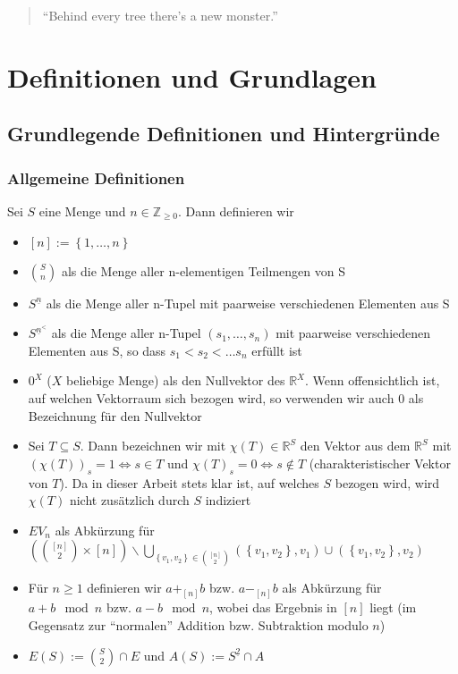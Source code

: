 \documentclass[10p,a4paper,BCOR = 12mm, DIV=15]{scrbook}
\begin{document}
\begin{quote}
"`Behind every tree there's a new monster."' \\
\end{quote}

\part{Definitionen und Grundlagen}

\label{part:def_grundlagen}

\chapter{Grundlegende Definitionen und Hintergründe}

\section{Allgemeine Definitionen}

\begin{Def}
Sei $S$ eine Menge und $n\in\mathbb{Z}_{\geq 0}$. Dann definieren wir
\begin{itemize}
\item $\left[n\right] := \left\{1, \ldots, n\right\}$
\item $S \choose n$ als die Menge aller n-elementigen Teilmengen von S
\item $S^{\underline{n}}$ als die Menge aller n-Tupel mit paarweise verschiedenen Elementen aus S
\item $S^{\underline{n}^<}$ als die Menge aller n-Tupel $\left(s_1, \ldots, s_n\right)$ mit paarweise verschiedenen Elementen aus S, so dass $s_1 < s_2 < \ldots s_n$ erfüllt ist
\item $0^X$ ($X$ beliebige Menge) als den Nullvektor des $\mathbb{R}^X$. Wenn offensichtlich ist, auf welchen Vektorraum sich bezogen wird, so verwenden wir auch $0$ als Bezeichnung für den Nullvektor
\item Sei $T \subseteq S$. Dann bezeichnen wir mit $\chi\left(T\right) \in \mathbb{R}^{S}$ den Vektor aus dem $\mathbb{R}^{S}$ mit $\left(\chi\left(T\right)\right)_s = 1 \Leftrightarrow s \in T$ und ${\chi\left(T\right)}_s = 0 \Leftrightarrow s \notin T$ (charakteristischer Vektor von $T$). Da in dieser Arbeit stets klar ist, auf welches $S$ bezogen wird, wird $\chi\left(T\right)$ nicht zusätzlich durch $S$ indiziert
\item $EV_n$ als Abkürzung für $\left({[n]\choose 2} \times [n]\right) \backslash \bigcup\limits_{\left\{v_1, v_2\right\} \in {[n]\choose 2}} \left(\left\{v_1, v_2\right\}, v_1\right) \cup \left(\left\{v_1, v_2\right\}, v_2\right)$
\item Für $n \geq 1$ definieren wir $a +_{\left[n\right]} b$ bzw. $a  -_{\left[n\right]} b$ als Abkürzung für $a + b \mod n$ bzw. $a - b \mod n$, wobei das Ergebnis in $\left[n\right]$ liegt (im Gegensatz zur "`normalen"' Addition bzw. Subtraktion modulo $n$)
\item $E \left(S\right) := {S \choose 2} \cap E$ und $A\left(S\right) := S^{\underline{2}} \cap A$
\end{itemize}
\end{Def}
\end{document}

